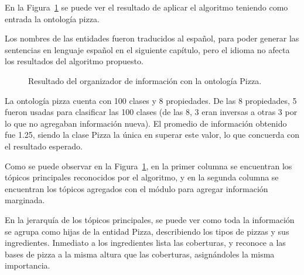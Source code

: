 En la Figura~\ref{fig:caso_estudio_pizza} se puede ver el resultado de aplicar el algoritmo teniendo como entrada la ontología pizza. 

Los nombres de las entidades fueron traducidos al español, para poder generar las sentencias en lenguaje español en el siguiente capítulo, pero el idioma no afecta los resultados del algoritmo propuesto.

\begin{figure}
\begin{multicols}{2}
\begin{figure}[H]
\end{figure}

\begin{figure}[H]
\end{figure}

\end{multicols}
\caption{Resultado del organizador de información con la ontología Pizza.}
\label{fig:caso_estudio_pizza}
\end{figure}

La ontología pizza cuenta con 100 clases y 8 propiedades. De las 8 propiedades, 5 fueron usadas  para clasificar las 100 clases (de las 8, 3 eran inversas a otras 3 por lo que no agregaban información nueva). El promedio de información obtenido fue 1.25, siendo la clase Pizza la única en superar este valor, lo que concuerda con el resultado esperado.

Como se puede observar en la Figura~\ref{fig:caso_estudio_pizza}, en la primer columna se encuentran los tópicos principales reconocidos por el algoritmo, y en la segunda columna se encuentran los tópicos agregados con el módulo para agregar información marginada.

En la jerarquía de los tópicos principales, se puede ver como toda la información se agrupa como hijas de la entidad Pizza, describiendo los tipos de pizzas y sus ingredientes. Inmediato a los ingredientes lista las coberturas, y reconoce a las bases de pizza a la misma altura que las coberturas, asignándoles la misma importancia.

